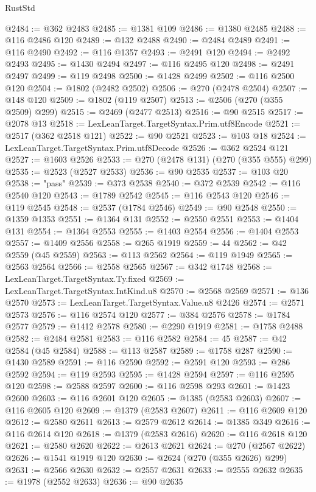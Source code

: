 \begin{lexlean}{RustStd}
\begin{coremodule}
@2484 := @362 @2483
@2485 := @1381 @109
@2486 := @1380 @2485
@2488 := @116 @2486 @120
@2489 := @132 @2488
@2490 := @2484 @2489
@2491 := @116 @2490
@2492 := @116 @1357
@2493 := @2491 @120
@2494 := @2492 @2493
@2495 := @1430 @2494
@2497 := @116 @2495 @120
@2498 := @2491 @2497
@2499 := @119 @2498
@2500 := @1428 @2499
@2502 := @116 @2500 @120
@2504 := @1802 (@2482 @2502)
@2506 := @270 (@2478 @2504)
@2507 := @148 @120
@2509 := @1802 (@119 @2507)
@2513 := @2506 (@270 (@355 @2509) @299)
@2515 := @2469 (@2477 @2513)
@2516 := @90 @2515
@2517 := @2078 @13
@2518 := LexLeanTarget.TargetSyntax.Prim.utf8Encode
@2521 := @2517 (@362 @2518 @121)
@2522 := @90 @2521
@2523 := @103 @18
@2524 := LexLeanTarget.TargetSyntax.Prim.utf8Decode
@2526 := @362 @2524 @121
@2527 := @1603 @2526
@2533 := @270 (@2478 @131) (@270 (@355 @555) @299)
@2535 := @2523 (@2527 @2533)
@2536 := @90 @2535
@2537 := @103 @20
@2538 := "pass"
@2539 := @373 @2538
@2540 := @372 @2539
@2542 := @116 @2540 @120
@2543 := @1789 @2542
@2545 := @116 @2543 @120
@2546 := @119 @2545
@2548 := @2537 (@1784 @2546)
@2549 := @90 @2548
@2550 := @1359 @1353
@2551 := @1364 @131
@2552 := @2550 @2551
@2553 := @1404 @131
@2554 := @1364 @2553
@2555 := @1403 @2554
@2556 := @1404 @2553
@2557 := @1409 @2556
@2558 := @265 @1919
@2559 := 44
@2562 := @42 @2559 (@45 @2559)
@2563 := @113 @2562
@2564 := @119 @1949
@2565 := @2563 @2564
@2566 := @2558 @2565
@2567 := @342 @1748
@2568 := LexLeanTarget.TargetSyntax.Ty.fixed
@2569 := LexLeanTarget.TargetSyntax.IntKind.u8
@2570 := @2568 @2569
@2571 := @136 @2570
@2573 := LexLeanTarget.TargetSyntax.Value.u8 @2426
@2574 := @2571 @2573
@2576 := @116 @2574 @120
@2577 := @384 @2576
@2578 := @1784 @2577
@2579 := @1412 @2578
@2580 := @2290 @1919
@2581 := @1758 @2488
@2582 := @2484 @2581
@2583 := @116 @2582
@2584 := 45
@2587 := @42 @2584 (@45 @2584)
@2588 := @113 @2587
@2589 := @1758 @287
@2590 := @1430 @2589
@2591 := @116 @2590
@2592 := @2591 @120
@2593 := @286 @2592
@2594 := @119 @2593
@2595 := @1428 @2594
@2597 := @116 @2595 @120
@2598 := @2588 @2597
@2600 := @116 @2598 @293
@2601 := @1423 @2600
@2603 := @116 @2601 @120
@2605 := @1385 (@2583 @2603)
@2607 := @116 @2605 @120
@2609 := @1379 (@2583 @2607)
@2611 := @116 @2609 @120
@2612 := @2580 @2611
@2613 := @2579 @2612
@2614 := @1385 @349
@2616 := @116 @2614 @120
@2618 := @1379 (@2583 @2616)
@2620 := @116 @2618 @120
@2621 := @2580 @2620
@2622 := @2613 @2621
@2624 := @270 (@2567 @2622)
@2626 := @1541 @1919 @120
@2630 := @2624 (@270 (@355 @2626) @299)
@2631 := @2566 @2630
@2632 := @2557 @2631
@2633 := @2555 @2632
@2635 := @1978 (@2552 @2633)
@2636 := @90 @2635

\end{coremodule}
\end{lexlean}

